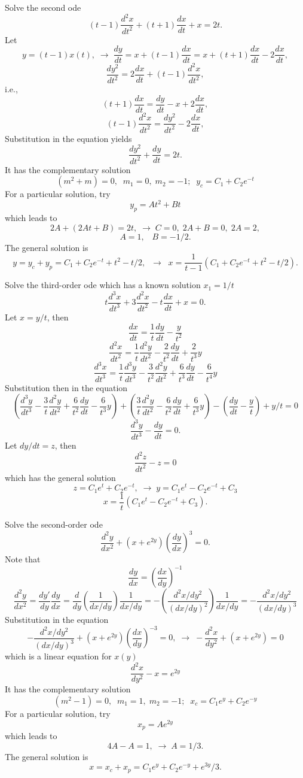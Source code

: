 \documentclass{article}
\begin{document}
\bigskip

 Solve the second ode
$$
(t-1)\frac{d^2 x}{ d t^2}+ (t+1)\frac{d x}{ d t}+x= 2 t.
$$
Let
$$
y=(t-1)x(t), \; \to \; \frac{d y}{ d t}=x+(t-1)\frac{d x}{ d t}
=x+(t+1)\frac{d x}{ d t} -2 \frac{d x}{ d t},
$$
$$
\frac{d y^2}{ d t^2}=2\frac{d x}{ d t}+(t-1)\frac{d^2 x}{ d t^2},
$$
i.e.,
$$
(t+1)\frac{d x}{ d t} = \frac{d y}{ d t}-x +2 \frac{d x}{ d t},
$$
$$
(t-1)\frac{d^2 x}{ d t^2}=\frac{d y^2}{ d t^2}-2\frac{d x}{ d t},
$$
Substitution in the equation yields
$$
\frac{d y^2}{ d t^2}+\frac{d y}{ d t}= 2 t.
$$
It has the complementary solution
$$
(m^2+m)=0, \;\; m_1=0, \; m_2=-1; \; \; y_c=C_1+C_2 e^{-t}
$$
For a particular solution, try
$$
y_p=At^2+Bt
$$
which leads to
$$
2A+ (2At+B)= 2 t, \; \to \; C=0,\; 2A+B=0,\; 2A=2,
$$
$$
A=1 ,\;\; \; B=-1/2.
$$
The general solution is
$$
y=y_c+y_p=C_1+C_2 e^{-t} + t^2- t/2, \;\; \to \;\; x=\frac{1}{
t-1} \left( C_1+C_2 e^{-t} + t^2- t/2 \right).
$$


\bigskip

 Solve the third-order ode which has a
known solution $x_1=1/t$
$$
t\frac{d^3 x}{ d t^3}+ 3 \frac{d^2 x}{ d t^2} -t\frac{d x}{ d
t}+x= 0.
$$
Let $ x=y/t$, then
$$
\frac{d x}{ d t} =\frac{1}{ t} \frac{d y}{ d t}- \frac{y}{ t^2}
$$
$$
\frac{d^2 x}{ d t^2} =\frac{1}{ t} \frac{d^2 y}{ d t^2}- \frac{2}{
t^2} \frac{d y}{ d t} + \frac{2 }{ t^3} y
$$
$$
\frac{d^3 x}{ d t^3} =\frac{1}{ t} \frac{d^3 y}{ d t^3}- \frac{3}{
t^2} \frac{d^2 y}{ d t^2} +   \frac{6}{ t^3} \frac{d y}{ d t}-
\frac{6 }{ t^4} y
$$
Substitution then in the equation
$$
\left(  \frac{d^3 y}{ d t^3}- \frac{3}{ t} \frac{d^2 y}{ d t^2} +
\frac{6}{ t^2} \frac{d y}{ d t}- \frac{6 }{ t^3} y \right) +
\left( \frac{3}{ t} \frac{d^2 y}{ d t^2}- \frac{6}{ t^2} \frac{d
y}{ d t} + \frac{6 }{ t^3} y \right) - \left(\frac{d y}{ d t}-
\frac{y}{ t}\right)+ y/t=0
$$
$$
\frac{d^3 y}{ d t^3} -  \frac{d y}{ d t} =0.
$$
Let $ dy/dt=z$, then
$$
\frac{d^2 z}{ d t^2} - z=0
$$
which has the general solution
$$
z= C_1 e^t+C_2 e^{-t}, \; \to \; y= C_1 e^t-C_2 e^{-t} +C_3
$$
$$
x= \frac{1}{t} \left( C_1 e^t-C_2 e^{-t} +C_3\right).
$$



\bigskip

 Solve the second-order ode
$$
\frac{d^2 y}{ d x^2}+ (x+ e^{2y}) \left( \frac{d y}{ d
x}\right)^3= 0.
$$
Note that
$$
\frac{d y}{ d x} =\left( \frac{ dx }{ dy } \right)^{-1}
$$
$$
\frac{d^2 y}{ d x^2} = \frac{d y' }{d y } \frac{d y }{d x }=
\frac{ d }{ dy } \left( \frac{ 1 }{dx/ dy } \right) \frac{1}{ d
x/dy}= -\left( \frac{ d^2 x/ dy^2 }{(dx/ dy)^2 } \right) \frac{1}{
d x/dy}= - \frac{ d^2 x/ dy^2 }{(dx/ dy)^3 }
$$
Substitution in the equation
$$
- \frac{ d^2 x/ dy^2 }{(dx/ dy)^3 } + (x+ e^{2y}) \left( \frac{ dx
}{ dy } \right)^{-3}=0, \; \to \; -\frac{ d^2 x}{ dy^2 } + (x+
e^{2y})=0
$$
which is a linear equation for $x(y)$
$$
\frac{ d^2 x}{ dy^2 } - x=  e^{2y}
$$
It has the complementary solution
$$
(m^2-1)=0, \;\; m_1=1, \; m_2=-1; \; \; x_c=C_1 e^{y}+C_2 e^{-y}
$$
For a particular solution, try
$$
x_p=A e^{2y}
$$
which leads to
$$
4A -A = 1, \; \to \;   A=1/3.
$$
The general solution is
$$
x=x_c+x_p=C_1 e^{y}+C_2 e^{-y}+ e^{3y}/3.
$$
\end{document}
